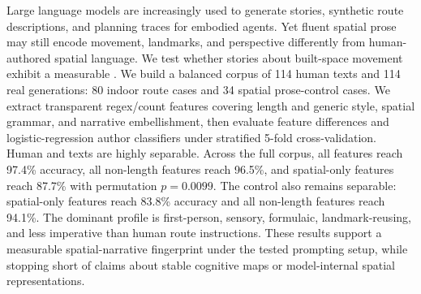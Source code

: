 Large language models are increasingly used to generate stories, synthetic route descriptions, and planning traces for embodied agents. Yet fluent spatial prose may still encode movement, landmarks, and perspective differently from human-authored spatial language. We test whether \llm stories about built-space movement exhibit a measurable \spatialgrammar. We build a balanced corpus of 114 human texts and 114 real \gptmini generations: 80 \rtr indoor route cases and 34 spatial \writingprompts prose-control cases. We extract transparent regex/count features covering length and generic style, spatial grammar, and narrative embellishment, then evaluate feature differences and logistic-regression author classifiers under stratified 5-fold cross-validation. Human and \llm texts are highly separable. Across the full corpus, all features reach 97.4\% accuracy, all non-length features reach 96.5\%, and spatial-only features reach 87.7\% with permutation $p=0.0099$. The \writingprompts control also remains separable: spatial-only features reach 83.8\% accuracy and all non-length features reach 94.1\%. The dominant \gptmini profile is first-person, sensory, formulaic, landmark-reusing, and less imperative than human route instructions. These results support a measurable \llm spatial-narrative fingerprint under the tested prompting setup, while stopping short of claims about stable cognitive maps or model-internal spatial representations.
